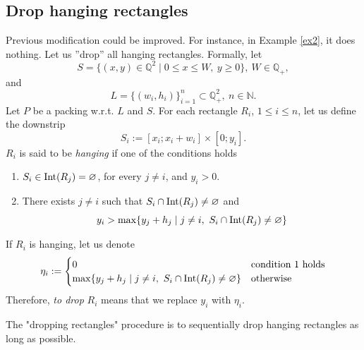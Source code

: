 \documentclass{article}
\theoremstyle{definition}
\theoremstyle{theorem}
\numberwithin{proposition}{section}
\begin{document}
    \subsection*{Drop hanging rectangles}
        Previous modification could be improved. For instance, in Example \ref{ex2}, it does nothing. Let us ''drop'' all hanging rectangles. Formally, let 
        \begin{equation*}
            S=\{(x,y)\in\mathbb{Q}^2\mid 0\leq x\leq W,~y\geq0\},~W\in\mathbb{Q}_{+},
        \end{equation*}
        and
        \begin{equation*}
            L=\{(w_i,h_i)\}_{i=1}^{n}\subset\mathbb{Q}^2_{+},~n\in\mathbb{N}.
        \end{equation*}
        Let $P$ be a packing w.r.t. $L$ and $S$. For each rectangle $R_i$, $1\leq i\leq n$, let us define the downstrip
        \begin{equation*}
            S_i:=[x_i;x_i+w_i]\times[0;y_i].
        \end{equation*}
        $R_i$ is said to be \textit{hanging} if one of the conditions holds
        \begin{enumerate}
            \item
                $S_i\in {\rm Int}(R_j)=\varnothing$, for every $j\neq i$, and $y_i>0$.
            \item
                There exists $j\neq i$ such that $S_i\cap{\rm Int}(R_j)\neq\varnothing$ and
                \begin{equation*}
                    y_i > \max\{y_j + h_j \mid j\neq i,~S_i\cap {\rm Int}(R_j)\neq\varnothing\}
                \end{equation*}
        \end{enumerate}
        If $R_i$ is hanging, let us denote
        \begin{equation*}
            \eta_i := \begin{cases}
                0 &\text{condition 1 holds}\\
                \max\{y_j + h_j \mid j\neq i,~S_i\cap{\rm Int}(R_j)\neq\varnothing\} &\text{otherwise}
            \end{cases}
        \end{equation*}
        Therefore, \textit{to drop} $R_i$ means that we replace $y_i$ with $\eta_i$.

        The "dropping rectangles" procedure is to sequentially drop hanging rectangles as long as possible.
\end{document}
